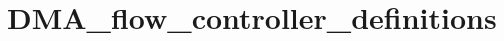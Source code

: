 \hypertarget{group___d_m_a__flow__controller__definitions}{\section{D\-M\-A\-\_\-flow\-\_\-controller\-\_\-definitions}
\label{group___d_m_a__flow__controller__definitions}
}
